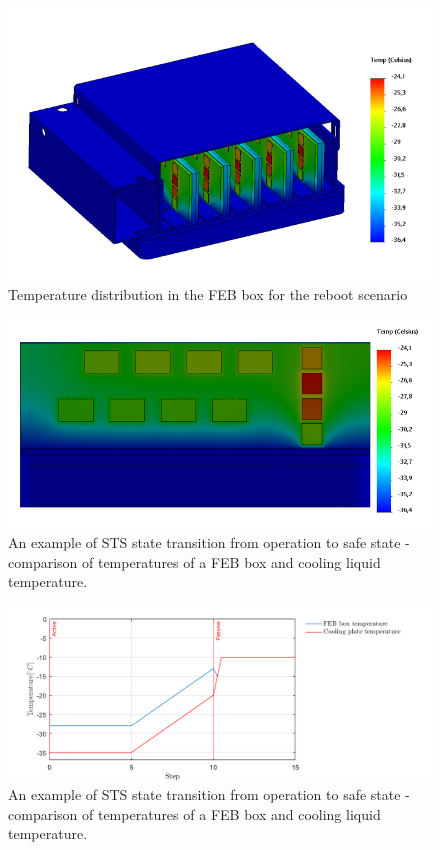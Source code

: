 \begin{figure}[!h]
\centering
\includegraphics[width=0.6\columnwidth]{Chapter4/images/reboot_box.png}
\caption{Temperature distribution in the \gls{FEB} box for the reboot scenario}
\label{fig_reboot_box}
\end{figure}

\begin{figure}[!h]
\centering
\includegraphics[width=0.6\columnwidth]{Chapter4/images/reboot_FEB.png}
\caption{An example of \gls{STS} state transition from operation to safe state - comparison of temperatures of a \gls{FEB} box and cooling liquid temperature.}
\label{fig_reboot_FEB}
\end{figure}

\begin{figure}[!h]
\centering
\includegraphics[width=0.95\columnwidth]{Chapter4/images/nominal.png}
\caption{An example of \gls{STS} state transition from operation to safe state - comparison of temperatures of a \gls{FEB} box and cooling liquid temperature.}
\label{fig_reboot_nominal}
\end{figure}

